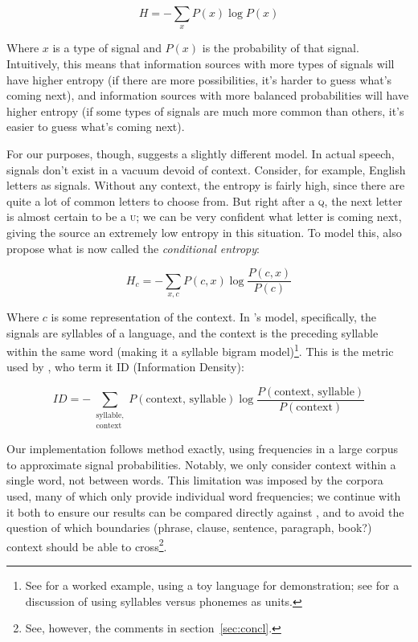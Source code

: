 \documentclass[12pt,twoside]{article}
\begin{document}
\begin{equation}
\label{eqn:shannon}
H = - \sum_x P(x) \log P(x)
\end{equation}

Where \(x\) is a type of signal and \(P(x)\) is the probability of that signal. Intuitively, this means that information sources with more types of signals will have higher entropy (if there are more possibilities, it's harder to guess what's coming next), and information sources with more balanced probabilities will have higher entropy (if some types of signals are much more common than others, it's easier to guess what's coming next).

For our purposes, though, \citet{oh} suggests a slightly different model. In actual speech, signals don't exist in a vacuum devoid of context. Consider, for example, English letters as signals. Without any context, the entropy is fairly high, since there are quite a lot of common letters to choose from. But right after a \textsc{q}, the next letter is almost certain to be a \textsc{u}; we can be very confident what letter is coming next, giving the source an extremely low entropy in this situation. To model this, \citet[52]{shannon} also propose what is now called the \emph{conditional entropy}:

\begin{equation}
H_c = - \sum_{x,c} P(c,x) \log \frac{P(c,x)}{P(c)}
\end{equation}

Where \(c\) is some representation of the context. In \citeauthor{oh}'s model, specifically, the signals are syllables of a language, and the context is the preceding syllable within the same word (making it a syllable bigram model)\footnote{See \cite[41]{oh} for a worked example, using a toy language for demonstration; see \cite[545]{pellegrino} for a discussion of using syllables versus phonemes as units.}. This is the metric used by \citet{coupé}, who term it ID (Information Density):

\begin{equation}
\label{eq:id}
ID = - \sum_{\substack{\textrm{syllable},\\\textrm{context}}} P(\textrm{context, syllable}) \log \frac{P(\textrm{context, syllable})}{P(\textrm{context})}
\end{equation}

Our implementation follows  method exactly, using frequencies in a large corpus to approximate signal probabilities. Notably, we only consider context within a single word, not between words. This limitation was imposed by the corpora \citeauthor{oh} used, many of which only provide individual word frequencies; we continue with it both to ensure our results can be compared directly against , and to avoid the question of which boundaries (phrase, clause, sentence, paragraph, book?) context should be able to cross\footnote{See, however, the comments in section~\ref{sec:concl}.}.
\end{document}
